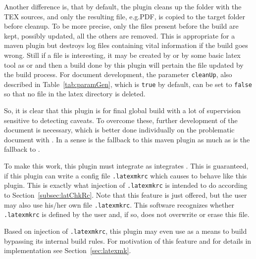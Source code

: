 Another difference is, that by default, 
the plugin cleans up the folder with the TEX sources, 
and only the resulting file, e.g.\@ PDF, 
is copied to the target folder before cleanup. 
To be more precise, 
only the files present before the build are kept, possibly updated, 
all the others are removed. 
This is appropriate for a maven plugin 
but destroys log files containing vital information 
if the build goes wrong. 
Still if a file is interesting, 
it may be created by  or by some basic latex tool 
as \lualatex{} or  
and then a build done by this plugin 
will pertain the file updated by the build process. 
For document development, 
the parameter \texttt{cleanUp}, also described in Table~\ref{tab:paramGen}, 
which is \texttt{true} by default, can be set to \texttt{false} 
so that no file in the latex directory is deleted. 

So, it is clear that this plugin is for final global build with a lot of supervision 
sensitive to detecting caveats. 
To overcome these, further development of the document is necessary, 
which is better done individually on the problematic document with . 
In a sense  is the fallback to this maven plugin 
as much as \lualatex{} is the fallback to . 

To make this work, this plugin must integrate  
as  integrates \lualatex. 
This is guaranteed, if this plugin can write a config file \texttt{.latexmkrc} 
which causes  to behave like this plugin. 
This is exactly what injection of \texttt{.latexmkrc} is intended to do 
according to Section~\ref{subsec:latChkRc}. 
Note that this feature is just offered, 
but the user may also use his/her own file \texttt{.latexmkrc}. 
This software recognizes whether \texttt{.latexmkrc} is defined by the user 
and, if so, does not overwrite or erase this file. 

Based on injection of \texttt{.latexmkrc}, 
this plugin may even use  
as a means to build bypassing its internal build rules. 
For motivation of this feature 
and for details in implementation see Section~\ref{sec:latexmk}. 

